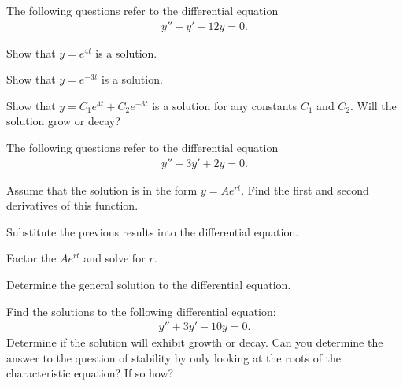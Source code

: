 

\begin{problem}
\item The following questions refer to the  differential
  equation
  \begin{eqnarray*}
    y'' - y' - 12y = 0.
  \end{eqnarray*}

  \begin{subproblem}
  \item Show that $y=e^{4t}$ is a solution.
    \vspace{4cm}
  \item Show that $y=e^{-3t}$ is a solution.
    \vspace{4cm}
  \item Show that $y=C_1 e^{4t} + C_2 e^{-3t}$ is a solution for
    any constants $C_1$ and $C_2$. Will the solution grow or
    decay?

    \vfill

  \end{subproblem}

\end{problem}


  \begin{problem}

  \item The following questions refer to the  differential
    equation
    \begin{eqnarray*}
      y'' + 3 y' + 2 y = 0.
    \end{eqnarray*}
    \begin{subproblem}
    \item Assume that the solution is in the form $y=Ae^{rt}$. Find
      the first and second derivatives of this function.
      \vfill

    \item Substitute the previous results into the differential equation.
      \vfill
      
    \item Factor the $Ae^{rt}$ and solve for $r$.
      \vfill

    \item Determine the general solution to the differential equation.
      \vfill
    
    \end{subproblem}


 
    \clearpage
  \item Find the solutions to the following differential equation:
    \begin{eqnarray*}
      y'' + 3y' - 10y = 0.
    \end{eqnarray*}
    Determine if the solution will exhibit growth or decay. Can you
    determine the answer to the question of stability by only looking
    at the roots of the characteristic equation? If so how?

    \vfill
  \end{problem}


